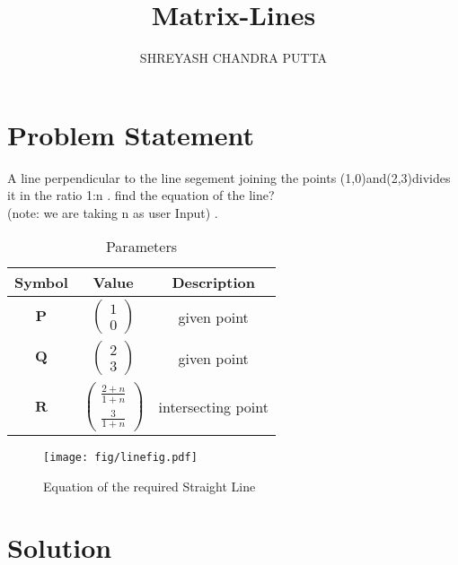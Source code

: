 \documentclass[journal,12pt,twocolumn]{article}
\title{
Matrix-Lines
}
\author{SHREYASH CHANDRA PUTTA}
\newcommand{\myvec}[1]{\ensuremath{\begin{pmatrix}#1\end{pmatrix}}}
\let\vec\mathbf
\begin{document}
\maketitle

\section{Problem Statement}
A line perpendicular to the line segement joining the points (1,0)and(2,3)divides it in the ratio 1:n . find the equation of the line?\\
(note: we are taking n as user Input) .

% 

\begin{table}[h]
    \centering
    \begin{tabular}{|c|c|c|}
       \hline
       \textbf{Symbol}&\textbf{Value}&\textbf{Description}  \\
       \hline
	    $\vec{P}$ & $\myvec{
		    1\\
		    0}$
	    & given point\\
        \hline
	    $\vec{Q}$ & $\myvec{2\\3}$
 & given point\\
        \hline
	    $\vec{R}$ & $\myvec{
  \frac{2+n}{1+n}\\
  \frac{3}{1+n}}$
 & intersecting point  \\
       \hline
    \end{tabular}
    \caption{Parameters}
    \label{tab:my_label}
\end{table}


\begin{figure}[h]
    \centering
\texttt{[image: fig/linefig.pdf]}
    \caption{Equation of the required Straight Line}
    \label{fig:my_label}
\end{figure}




\section{Solution}
\end{document}

